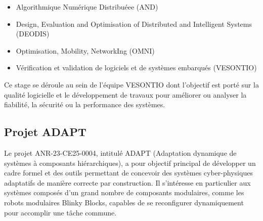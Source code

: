 \begin{itemize}[label=$\bullet$]
    \item Algorithmique Numérique Distribuéee (AND)
    \item Design, Evaluation and Optimisation of Distributed and Intelligent Systems (DEODIS)
    \item Optimisation, Mobility, NetworkIng (OMNI)
    \item Vérification et validation de logiciels et de systèmes embarqués (VESONTIO)
\end{itemize}

Ce stage se déroule au sein de l'équipe VESONTIO dont l'objectif est porté sur la qualité logicielle et le développement de travaux pour améliorer ou analyser la fiabilité, la sécurité ou la performance des systèmes.

\subsection{Projet ADAPT}

Le projet ANR-23-CE25-0004, intitulé ADAPT (Adaptation dynamique de systèmes à composants hiérarchiques), a pour objectif principal de développer un cadre formel et des outils permettant de concevoir des systèmes cyber-physiques adaptatifs de manière correcte par construction. Il s'intéresse en particulier aux systèmes composés d'un grand nombre de composants modulaires, comme les robots modulaires Blinky Blocks, capables de se reconfigurer dynamiquement pour accomplir une tâche commune.

